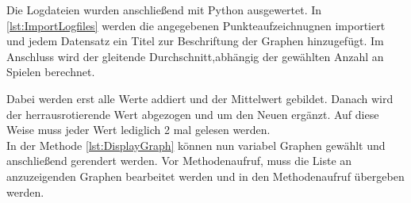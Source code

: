 Die Logdateien wurden anschließend mit Python ausgewertet. In \ref{lst:ImportLogfiles} werden die angegebenen Punkteaufzeichnugnen importiert und jedem Datensatz ein Titel zur Beschriftung der Graphen hinzugefügt. Im Anschluss wird der gleitende Durchschnitt,abhängig der gewählten Anzahl an Spielen berechnet. 

Dabei werden erst alle Werte addiert und der Mittelwert gebildet. Danach wird der herrausrotierende Wert abgezogen und um den Neuen ergänzt. Auf diese Weise muss jeder Wert lediglich 2 mal gelesen werden. \\ In der Methode \ref{lst:DisplayGraph} können nun variabel Graphen gewählt und anschließend gerendert werden. Vor Methodenaufruf, muss die Liste an anzuzeigenden Graphen bearbeitet werden und in den Methodenaufruf übergeben werden. 




